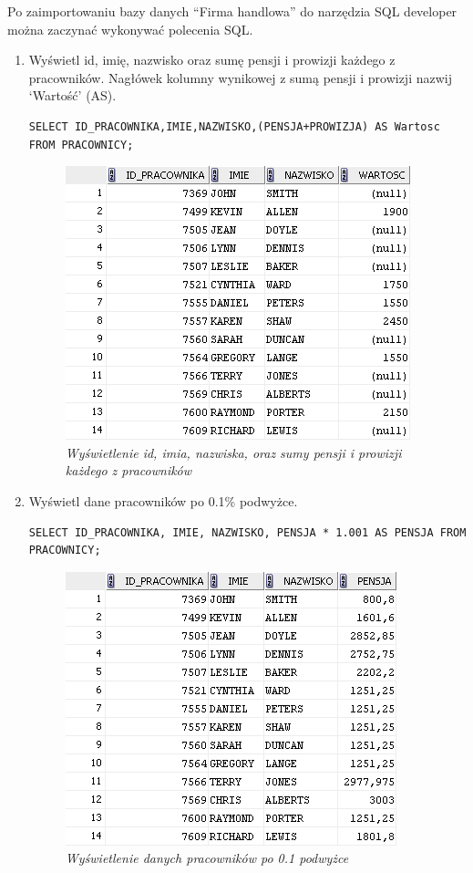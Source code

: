 \documentclass[a4paper, 10pt]{article}
\begin{document}
Po zaimportowaniu bazy danych ``Firma handlowa'' do narzędzia SQL developer można zaczynać  wykonywać polecenia SQL.

\begin{enumerate}

\item Wyświetl id, imię, nazwisko oraz sumę pensji i prowizji każdego z pracowników. Nagłówek kolumny wynikowej z sumą pensji i prowizji nazwij `Wartość' (AS). 

\begin{lstlisting}[style=SQL, caption=\textit{Wyświetlenie id, imia, nazwiska oraz sumy pensji i prowizji każdego z pracowników}]
SELECT ID_PRACOWNIKA,IMIE,NAZWISKO,(PENSJA+PROWIZJA) AS Wartosc FROM PRACOWNICY;
\end{lstlisting}

\begin{figure}[H]
	\centering
	\includegraphics[scale=0.7]{zadanie1.png}
	\caption{\textit{Wyświetlenie id, imia, nazwiska, oraz sumy pensji i prowizji każdego z pracowników}}
\end{figure}

\item Wyświetl dane pracowników po 0.1\% podwyżce.
\begin{lstlisting}[style=SQL, caption=\textit{Wyświetlenie danych pracowników po 0.1 podwyżce}]
SELECT ID_PRACOWNIKA, IMIE, NAZWISKO, PENSJA * 1.001 AS PENSJA FROM PRACOWNICY;
\end{lstlisting}

\begin{figure}[H]
	\centering
	\includegraphics[scale=0.7]{zadanie2.png}
	\caption{\textit{Wyświetlenie danych pracowników po 0.1 podwyżce}}
\end{figure}



\end{enumerate}
\end{document}
